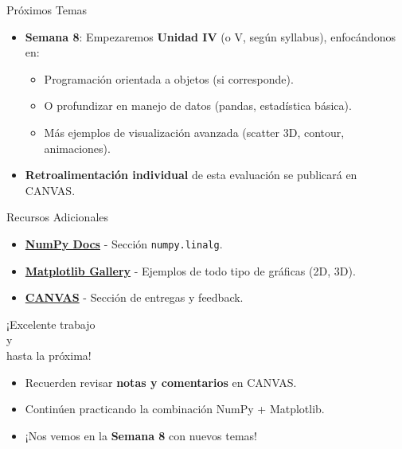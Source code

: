 \documentclass[10pt]{beamer}
\begin{document}
\begin{frame}{Próximos Temas}
  \begin{itemize}
    \item \textbf{Semana 8}: Empezaremos \textbf{Unidad IV} (o V, según syllabus), enfocándonos en:
      \begin{itemize}
        \item Programación orientada a objetos (si corresponde).
        \item O profundizar en manejo de datos (pandas, estadística básica).
        \item Más ejemplos de visualización avanzada (scatter 3D, contour, animaciones).
      \end{itemize}
    \item \textbf{Retroalimentación individual} de esta evaluación se publicará en CANVAS.
  \end{itemize}
\end{frame}

\begin{frame}{Recursos Adicionales}
  \begin{itemize}
    \item \href{https://numpy.org/doc/}{\textbf{NumPy Docs}} - Sección \texttt{numpy.linalg}.
    \item \href{https://matplotlib.org/3.1.1/gallery/index.html}{\textbf{Matplotlib Gallery}} - Ejemplos de todo tipo de gráficas (2D, 3D).
    \item \href{https://canvas.instructure.com/}{\textbf{CANVAS}} - Sección de entregas y feedback.
  \end{itemize}
\end{frame}

\begin{frame}
  \Large{\centerline{¡Excelente trabajo \\ y \\ hasta la próxima!}}
  \vspace{0.25cm}
  \small
  \begin{itemize}
    \setlength{\itemsep}{0.2em}
    \item Recuerden revisar \textbf{notas y comentarios} en CANVAS.
    \item Continúen practicando la combinación NumPy + Matplotlib.
    \item ¡Nos vemos en la \textbf{Semana 8} con nuevos temas!
  \end{itemize}
\end{frame}
\end{document}
